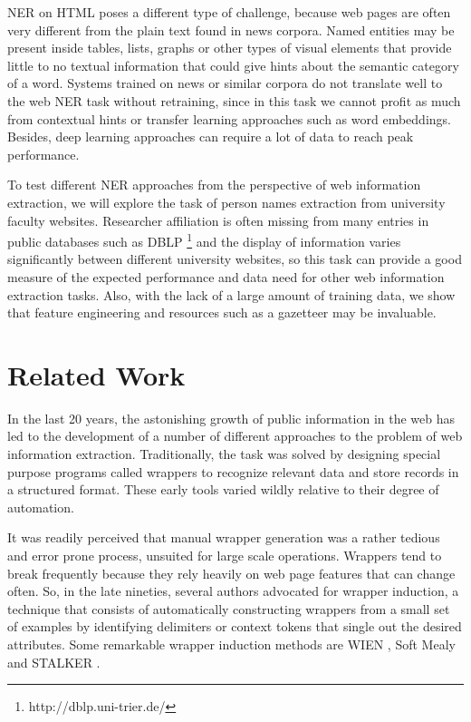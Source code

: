 \documentclass[sigconf]{acmart}
\begin{document}
NER on HTML poses a different type of challenge, because web pages are often
very different from the plain text found in news corpora. Named entities may be present 
inside tables, lists, graphs or other types of visual elements that provide
little to no textual information that could give hints about the semantic category of 
a word. Systems trained on news or similar corpora do not translate well to the web
NER task without retraining, since in this task we cannot profit
as much from contextual hints or transfer learning approaches such as word embeddings.
Besides, deep learning approaches can require a lot of data to reach peak performance. 

To test different NER approaches from the perspective of web information extraction,
we will explore the task of person names extraction from university faculty websites.
Researcher affiliation is often missing from many entries in public databases such as DBLP  
\footnote{
  http://dblp.uni-trier.de/
} and the display of information varies significantly between different university 
websites, so this task can provide a good measure of the expected performance and
data need for other web information extraction tasks. Also, with the lack of a large amount
of training data, we show that feature engineering and resources such as a gazetteer 
may be invaluable.

\section{Related Work}

In the last 20 years, the astonishing growth of public information in the web has 
led to the development of a number of different approaches to the problem of web 
information extraction. Traditionally, the task was solved by designing special purpose
programs called wrappers to recognize relevant data and store records in a structured
format. These early tools varied wildly relative to their degree of automation. 

It was readily perceived that manual wrapper generation was a rather tedious and
error prone process, unsuited for large scale operations. Wrappers tend to
break frequently because they rely heavily on web page features that can change 
often. So, in the late nineties, several authors advocated for wrapper induction, a technique 
that consists of automatically constructing wrappers from a small set of examples by 
identifying delimiters or context tokens that single out the desired attributes. 
Some remarkable wrapper induction methods are WIEN \cite{Kushmerick2000}, Soft 
Mealy \cite{Hsu1998} and STALKER \cite{Muslea1999}.
\end{document}
